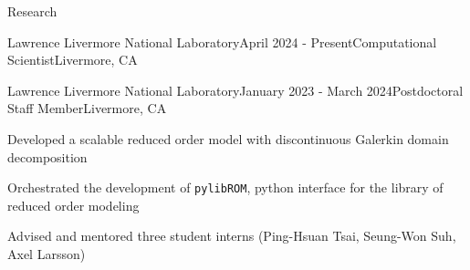 \documentclass{resume} %
\begin{document}
\begin{rSection}{Research}

\begin{rSubsection}{Lawrence Livermore National Laboratory}{April 2024 - Present}{Computational Scientist}{Livermore, CA}
\item[]
\vspace{-20pt}
\end{rSubsection}

\begin{rSubsection}{Lawrence Livermore National Laboratory}{January 2023 - March 2024}{Postdoctoral Staff Member}{Livermore, CA}
\item Developed a scalable reduced order model with discontinuous Galerkin domain decomposition
\item Orchestrated the development of \texttt{pylibROM}, python interface for the library of reduced order modeling
\item Advised and mentored three student interns (Ping-Hsuan Tsai, Seung-Won Suh, Axel Larsson)
\end{rSubsection}


\end{rSection}
\end{document}
